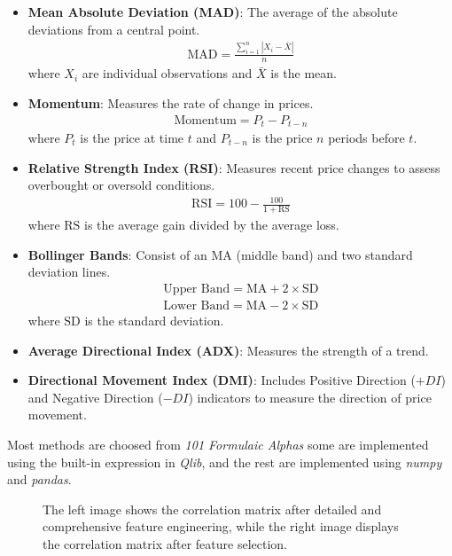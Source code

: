 \documentclass[10pt,twocolumn,letterpaper]{article}
\begin{document}
\begin{itemize}
	\item \textbf{Mean Absolute Deviation (MAD)}: The average of the absolute deviations from a central point.
	      \begin{align*}
		      \text{MAD} = \frac{\sum_{i=1}^{n} |X_i - \bar{X}|}{n}
	      \end{align*}
	      where \( X_i \) are individual observations and \( \bar{X} \) is the mean.

	\item \textbf{Momentum}: Measures the rate of change in prices.
	      \begin{align*}
		      \text{Momentum} = P_t - P_{t-n}
	      \end{align*}
	      where \( P_t \) is the price at time \( t \) and \( P_{t-n} \) is the price \( n \) periods before \( t \).

	\item \textbf{Relative Strength Index (RSI)}: Measures recent price changes to assess overbought or oversold conditions.
	      \begin{align*}
		      \text{RSI} = 100 - \frac{100}{1 + \text{RS}}
	      \end{align*}
	      where \( \text{RS} \) is the average gain divided by the average loss.

	\item \textbf{Bollinger Bands}: Consist of an MA (middle band) and two standard deviation lines.
	      \begin{align*}
		      \text{Upper Band} = \text{MA} + 2 \times \text{SD} \\
		      \text{Lower Band} = \text{MA} - 2 \times \text{SD}
	      \end{align*}
	      where \( \text{SD} \) is the standard deviation.

	\item \textbf{Average Directional Index (ADX)}: Measures the strength of a trend.

	\item \textbf{Directional Movement Index (DMI)}: Includes Positive Direction ($+DI$) and Negative Direction ($-DI$) indicators to measure the direction of price movement.
\end{itemize}
Most methods are choosed from \textit{101 Formulaic Alphas}\cite{zura2015101} some are implemented using the built-in expression in \textit{Qlib}\cite{yang2020qlib}, and the rest are implemented using \textit{numpy} and \textit{pandas}.
\begin{figure}[t]
	\centering
	\caption{The left image shows the correlation matrix after detailed and comprehensive feature engineering, while the right image displays the correlation matrix after feature selection.}
	\label{fig:feat_corr}
\end{figure}
\end{document}
